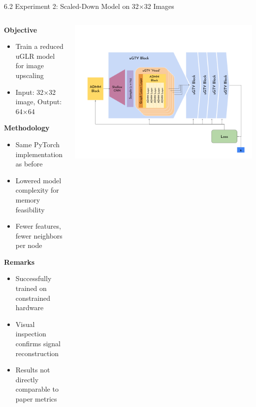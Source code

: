 \documentclass[aspectratio=169,xcolor=dvipsnames]{beamer}
\begin{document}
\begin{frame}{6.2 Experiment 2: Scaled-Down Model on 32×32 Images}


\begin{columns}[T]

\begin{column}{0.50\textwidth}

\textbf{Objective}
\vspace{-0.1cm}
\begin{itemize}
    \setlength\itemsep{2pt}
    \item Train a reduced uGLR model for image upscaling
    \item Input: 32×32 image, Output: 64×64
\end{itemize}

\textbf{Methodology}
\vspace{-0.1cm}
\begin{itemize}
    \setlength\itemsep{2pt}
    \item Same PyTorch implementation as before
    \item Lowered model complexity for memory feasibility
    \item Fewer features, fewer neighbors per node
\end{itemize}

\textbf{Remarks}
\vspace{-0.1cm}
\begin{itemize}
    \setlength\itemsep{2pt}
    \item Successfully trained on constrained hardware
    \item Visual inspection confirms signal reconstruction
    \item Results not directly comparable to paper metrics
\end{itemize}

\end{column}

\begin{column}{0.55\textwidth}
\begin{center}

\includegraphics[width=1\linewidth]{Method Diagram .png}



\end{center}
\end{column}
\end{columns}
\end{frame}
\end{document}
